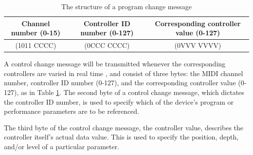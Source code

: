 \begin{table}
	\centering
	\begin{tabular}{|c|c|c|}
	\hline
		Channel number (0-15) & Controller ID number (0-127) & Corresponding controller value (0-127) \\
		\hline
		(1011 CCCC) & (0CCC CCCC) & (0VVV VVVV) \\
	\hline
	\end{tabular}
	\caption{The structure of a program change message}
	\label{tbl:byte-structure-control-change-message}
\end{table}

A control change message will be transmitted whenever the corresponding controllers are varied in real time \cite{Huber_2012}, and consist of three bytes: the MIDI channel number, controller ID number (0-127), and the corresponding controller value (0-127), as in Table \ref{tbl:byte-structure-control-change-message}. The second byte of a control change message, which dictates the controller ID number, is used to specify which of the device's program or performance parameters are to be referenced. 

The third byte of the control change message, the controller value, describes the controller itself's actual data value. This is used to specify the position, depth, and/or level of a particular parameter\cite{Huber_2012}.